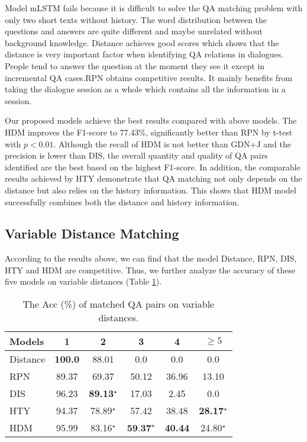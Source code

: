 Model mLSTM fails because it is difficult to solve the QA matching problem with 
only two short texts without history. The word distribution between the questions 
and answers are quite different and maybe unrelated without background knowledge. 
Distance achieves good scores which shows that the distance is very important factor 
when identifying QA relations in dialogues. People tend to answer the question at the moment they see it except in incremental QA cases.RPN obtains competitive results. It mainly benefits from taking the dialogue session as a whole which contains all the information in a session. 
 
Our proposed models achieve the best results compared with above models. 
The HDM improves the F1-score to 77.43\%, significantly better than RPN by t-test with
$p<0.01$. 
Although the recall of HDM is not better than GDN+J and the precision is 
lower than DIS, the overall quantity and quality of QA pairs identified 
are the best based on the highest F1-score. 
In addition, the comparable results achieved by HTY demonstrate that QA matching not only depends on 
the distance but also relies on the history information.
This shows that HDM model successfully combines both the distance and history 
information.


\subsection{Variable Distance Matching}

 According to the results above, we can find that the model Distance, RPN, DIS, HTY and HDM are competitive. Thus, we further analyze the accuracy of these five models on variable distances (Table \ref{tab:longrangeResults}).

\begin{table}[th]
	\scriptsize
	\centering
	\begin{tabular}{p{1.5cm}<{\centering}ccccc}
		\toprule[1.3pt]
		 Models &1&2&3&4&$\geq5$\\
		\midrule[1pt]
		Distance      &\textbf{100.0}&88.01&0.0&0.0&0.0 \\
		RPN  &89.37&69.37&50.12&36.96&13.10\\	
		DIS &96.23&\textbf{89.13}$^\star$&17.03&2.45&0.0\\
		HTY &94.37&78.89$^\star$&57.42&38.48&\textbf{28.17}$^\star$\\
		HDM &95.99&83.16$^\star$&$\textbf{59.37}^\star$&\textbf{40.44}&24.80$^\star$\\
		\bottomrule[1.3pt]
	\end{tabular}
	\vspace{-0.25cm}
	\caption{The Acc (\%) of matched QA pairs on variable distances.}
	\label{tab:longrangeResults}
\end{table}

